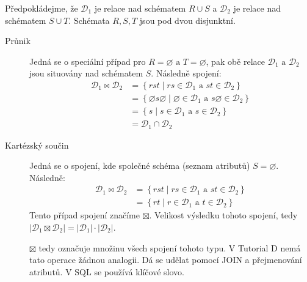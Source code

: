 Předpokládejme, že $\mathcal{D}_{1}$ je relace nad schématem $R \cup S$ a $\mathcal{D}_{2}$ je relace nad schématem $S \cup T$. Schémata $R, S, T$ jsou pod dvou disjunktní. 
\begin{description}
\item[Průnik] Jedná se o speciální případ pro $R = \varnothing \text{ a } T = \varnothing$, pak obě relace $\mathcal{D}_{1} \text{ a } \mathcal{D}_{2}$ jsou situovány nad schématem $S$. Následně spojení:
\begin{align*}
\mathcal{D}_{1} \Join \mathcal{D}_{2} &= \left\{ rst \; | \; rs \in \mathcal{D}_{1} \text{ a } st \in \mathcal{D}_{2} \right\} \\
&= \left\{ \varnothing s \varnothing \; | \; \varnothing \in \mathcal{D}_{1} \text{ a } s \varnothing \in \mathcal{D}_{2} \right\} \\
&= \left\{ s \; | \; s \in \mathcal{D}_{1} \text{ a } s \in \mathcal{D}_{2} \right\} \\
&= \mathcal{D}_{1} \cap \mathcal{D}_{2}
\end{align*}

\item[Kartézský součin] Jedná se o spojení, kde společné schéma (seznam atributů) $S = \varnothing$. Následně:
\begin{align*}
\mathcal{D}_{1} \Join \mathcal{D}_{2} &= \left\{ rst \; | \; rs \in \mathcal{D}_{1} \text{ a } st \in \mathcal{D}_{2} \right\} \\
&= \left\{ rt \; | \; r \in \mathcal{D}_{1} \text{ a } t \in \mathcal{D}_{2} \right\}
\end{align*}
Tento případ spojení značíme $\boxtimes$. Velikost výsledku tohoto spojení, tedy $\left| \mathcal{D}_{1} \boxtimes \mathcal{D}_{2} \right| = \left|\mathcal{D}_{1}\right| \cdot \left|\mathcal{D}_{2}\right|$.

$\boxtimes$ tedy označuje množinu všech spojení tohoto typu. V Tutorial D nemá tato operace žádnou analogii. Dá se udělat pomocí JOIN a přejmenování atributů. V SQL se používá klíčové slovo.


\end{description}
